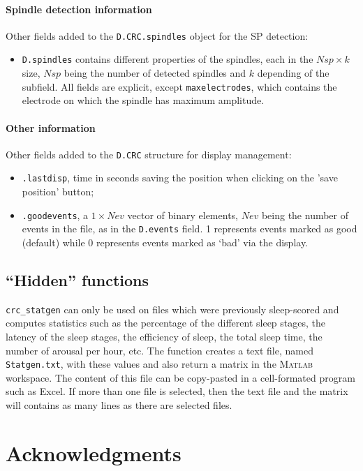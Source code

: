 \documentclass[a4paper,titlepage]{article}
\newcommand{\bi}{\begin{itemize}}
\newcommand{\ei}{\end{itemize}}
\newcommand{\matlab}{\textsc{Matlab }}
\begin{document}
\paragraph{Spindle detection information}
Other fields added to the {\tt D.CRC.spindles} object for the SP detection:
\bi
\item {\tt D.spindles} contains different properties of the spindles, each in the $N\!sp\times k$ size, $N\!sp$ being the number of detected spindles and $k$ depending of the subfield. All fields are explicit, except {\tt maxelectrodes}, which contains the electrode on which the spindle has maximum amplitude.
\ei

\paragraph{Other information}
Other fields added to the {\tt D.CRC} structure for display management:
\bi
\item {\tt .lastdisp}, time in seconds saving the position when clicking on the 'save position' button;
\item {\tt .goodevents}, a $1\times N\!ev$ vector of binary elements, $N\!ev$ being the number of events in the file, as in the {\tt D.events} field. 1 represents events marked as good (default) while 0 represents events marked as `bad' via the display.
\ei

\subsection{``Hidden'' functions}
{\tt crc\_statgen} can only be used on files which were previously sleep-scored and computes statistics such as the percentage of the different sleep stages, the latency of the sleep stages, the efficiency of sleep, the total sleep time, the number of arousal per hour, etc. The function creates a text file,  named {\tt Statgen.txt}, with these values and also return a matrix in the \matlab workspace. The content of this file can be copy-pasted in a cell-formated program such as Excel. If more than one file is selected, then the text file and the matrix will contains as many lines as there are selected files.

\section{Acknowledgments}
\label{sec:ackn}
\end{document}
